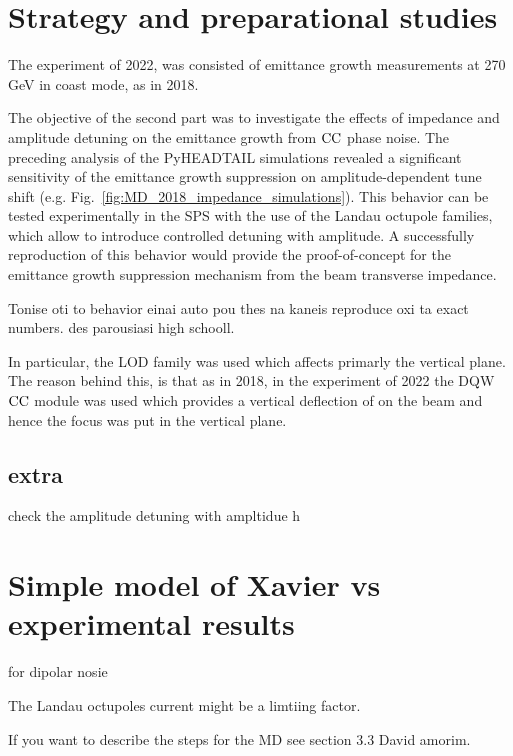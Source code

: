 \section{Strategy and preparational studies}\label{sec:strategy_md_2022}
The experiment of 2022, was consisted of emittance growth measurements at 270\,GeV in coast mode, as in 2018. 

The objective of the second part was to investigate the effects of impedance and amplitude detuning on the emittance growth from ${\mathrm{CC}}$ phase noise. The preceding analysis of the PyHEADTAIL simulations revealed a significant sensitivity of the emittance growth suppression on amplitude-dependent tune shift (e.g. Fig.~\ref{fig:MD_2018_impedance_simulations}). This behavior can be tested experimentally in the SPS with the use of the Landau octupole families, which allow to introduce controlled detuning with amplitude. A successfully reproduction of this behavior would provide the proof-of-concept for the emittance growth suppression mechanism from the beam transverse impedance.




Tonise oti to behavior einai auto pou thes na kaneis reproduce oxi ta exact numbers. des parousiasi high schooll.


In particular, the LOD family was used which affects primarly the vertical plane. The reason behind this, is that as in 2018, in the experiment of 2022 the DQW ${\mathrm{CC}}$ module was used which provides a vertical deflection of on the beam and hence the focus was put in the vertical plane.


\subsection{extra}
check the amplitude detuning with ampltidue
h%


\section{Simple model of Xavier vs experimental results}
for dipolar nosie


The Landau octupoles current might be a limtiing factor.


If you want to describe the steps for the MD see section 3.3 David amorim.